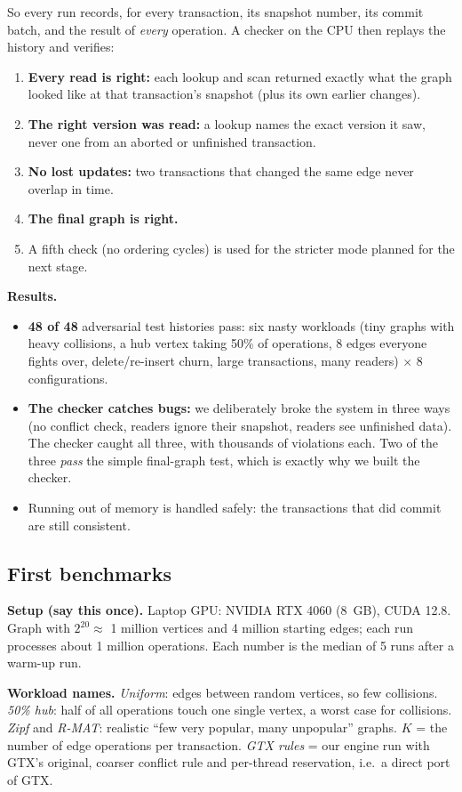 \documentclass[11pt,a4paper]{article}
\begin{document}
So every run records, for every transaction, its snapshot number, its commit batch, and the result of \emph{every}
operation. A checker on the CPU then replays the history and verifies:
\begin{enumerate}
\item \textbf{Every read is right:} each lookup and scan returned exactly what the graph looked like at that
  transaction's snapshot (plus its own earlier changes).
\item \textbf{The right version was read:} a lookup names the exact version it saw, never one from an aborted or
  unfinished transaction.
\item \textbf{No lost updates:} two transactions that changed the same edge never overlap in time.
\item \textbf{The final graph is right.}
\item A fifth check (no ordering cycles) is used for the stricter mode planned for the next stage.
\end{enumerate}

\textbf{Results.}
\begin{itemize}
\item \textbf{48 of 48} adversarial test histories pass: six nasty workloads (tiny graphs with heavy collisions, a hub
  vertex taking 50\% of operations, 8 edges everyone fights over, delete/re-insert churn, large transactions, many readers)
  $\times$ 8 configurations.
\item \textbf{The checker catches bugs:} we deliberately broke the system in three ways (no conflict check, readers ignore
  their snapshot, readers see unfinished data). The checker caught all three, with thousands of violations each. Two of
  the three \emph{pass} the simple final-graph test, which is exactly why we built the checker.
\item Running out of memory is handled safely: the transactions that did commit are still consistent.
\end{itemize}

\subsection{First benchmarks}
\textbf{Setup (say this once).} Laptop GPU: NVIDIA RTX 4060 (8~GB), CUDA 12.8. Graph with $2^{20}\approx$ 1 million
vertices and 4 million starting edges; each run processes about 1 million operations. Each number is the median of 5
runs after a warm-up run.

\textbf{Workload names.} \emph{Uniform}: edges between random vertices, so few collisions. \emph{50\% hub}: half of all
operations touch one single vertex, a worst case for collisions. \emph{Zipf} and \emph{R-MAT}: realistic ``few very
popular, many unpopular'' graphs. $K$ = the number of edge operations per transaction. \emph{GTX rules} = our engine run
with GTX's original, coarser conflict rule and per-thread reservation, i.e.\ a direct port of GTX.
\end{document}
